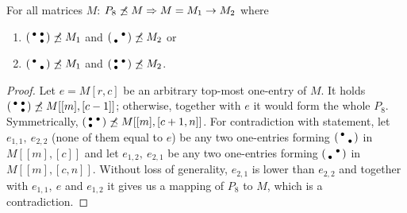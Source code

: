 \begin{lemma}
\label{lemma:p72}
For all matrices $M$: $P_8\not\preceq M\Rightarrow M=M_1\rightarrow M_2$ where
\begin{enumerate}
\item $\left(\begin{smallmatrix}\bullet&\bullet\\ &\bullet\end{smallmatrix}\right)\not\preceq M_1$ and $\left(\begin{smallmatrix} &\bullet\\\bullet& \end{smallmatrix}\right)\not\preceq M_2$ or
\item $\left(\begin{smallmatrix}\bullet& \\ &\bullet\end{smallmatrix}\right)\not\preceq M_1$ and $\left(\begin{smallmatrix}\bullet&\bullet\\\bullet& \end{smallmatrix}\right)\not\preceq M_2$.
\end{enumerate}
\end{lemma}
\begin{proof}
Let $e=M[r,c]$ be an arbitrary top-most one-entry of $M$. It holds $\left(\begin{smallmatrix}\bullet&\bullet\\ &\bullet\end{smallmatrix}\right)\not\preceq M[[m],[c-1]]$; otherwise, together with $e$ it would form the whole $P_8$. Symmetrically, $\left(\begin{smallmatrix}\bullet&\bullet\\\bullet& \end{smallmatrix}\right)\not\preceq M[[m],[c+1,n]]$. For contradiction with statement, let $e_{1,1},\ e_{2,2}$ (none of them equal to $e$) be any two one-entries forming $\left(\begin{smallmatrix}\bullet& \\ &\bullet\end{smallmatrix}\right)$ in $M[[m],[c]]$ and let $e_{1,2},\ e_{2,1}$ be any two one-entries forming $\left(\begin{smallmatrix} &\bullet\\\bullet& \end{smallmatrix}\right)$ in $M[[m],[c,n]]$. Without loss of generality, $e_{2,1}$ is lower than $e_{2,2}$ and together with $e_{1,1},\ e$ and $e_{1,2}$ it gives us a mapping of $P_8$ to $M$, which is a contradiction.
\end{proof}

